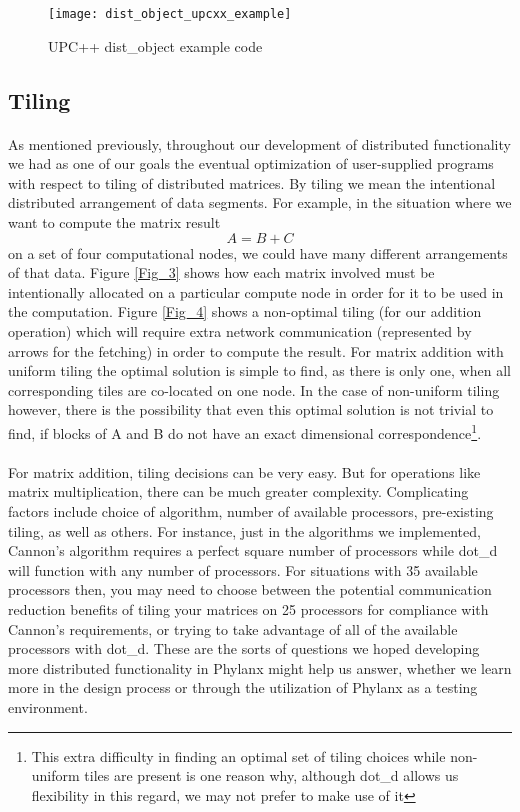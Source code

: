\begin{figure}
	\centering
	\texttt{[image: dist\_object\_upcxx\_example]}
	\caption{UPC++ dist\_object example code}
	\label{Fig_2}
\end{figure}

\subsection{Tiling}
\paragraph{}
As mentioned previously, throughout our development of distributed functionality we had as one of our goals the eventual optimization of user-supplied programs with respect to tiling of distributed matrices. By tiling we mean the intentional distributed arrangement of data segments. For example, in the situation where we want to compute the matrix result $$A=B+C$$ on a set of four computational nodes, we could have many different arrangements of that data. Figure \ref{Fig_3} shows how each matrix involved must be intentionally allocated on a particular compute node in order for it to be used in the computation. Figure \ref{Fig_4} shows a non-optimal tiling (for our addition operation) which will require extra network communication (represented by arrows for the fetching) in order to compute the result. For matrix addition with uniform tiling the optimal solution is simple to find, as there is only one, when all corresponding tiles are co-located on one node. In the case of non-uniform tiling however, there is the possibility that even this optimal solution is not trivial to find, if blocks of A and B do not have an exact dimensional correspondence\footnote{This extra difficulty in finding an optimal set of tiling choices while non-uniform tiles are present is one reason why, although dot\_d allows us flexibility in this regard, we may not prefer to make use of it}.
\paragraph{}
For matrix addition, tiling decisions can be very easy. But for operations like matrix multiplication, there can be much greater complexity. Complicating factors include choice of algorithm, number of available processors, pre-existing tiling, as well as others. For instance, just in the algorithms we implemented, Cannon's algorithm requires a perfect square number of processors while dot\_d will function with any number of processors.  For situations with 35 available processors then, you may need to choose between the potential communication reduction benefits of tiling your matrices on 25 processors for compliance with Cannon's requirements, or trying to take advantage of all of the available processors with dot\_d. These are the sorts of questions we hoped developing more distributed functionality in Phylanx might help us answer, whether  we learn more in the design process or through the utilization of Phylanx as a testing environment.

